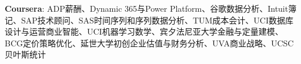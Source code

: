 \textbf{Coursera}: ADP薪酬、Dynamic 365与Power Platform、谷歌数据分析、Intuit簿记、SAP技术顾问、SAS时间序列和序列数据分析、TUM成本会计、UCI数据库设计与运营商业智能、UCI机器学习数学、宾夕法尼亚大学金融与定量建模、BCG定价策略优化、延世大学初创企业估值与财务分析、UVA商业战略、UCSC贝叶斯统计

